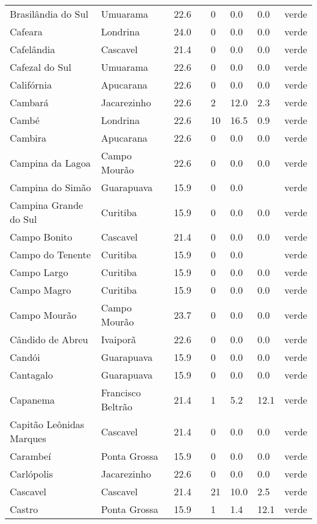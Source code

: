 \begin{longtable}{l|lllllll}
  Brasilândia do Sul & Umuarama & 22.6 &  & 0 & 0.0 & 0.0 & verde \\ 
  Cafeara & Londrina & 24.0 &  & 0 & 0.0 & 0.0 & verde \\ 
  Cafelândia & Cascavel & 21.4 &  & 0 & 0.0 & 0.0 & verde \\ 
  Cafezal do Sul & Umuarama & 22.6 &  & 0 & 0.0 & 0.0 & verde \\ 
  Califórnia & Apucarana & 22.6 &  & 0 & 0.0 & 0.0 & verde \\ 
  Cambará & Jacarezinho & 22.6 &  & 2 & 12.0 & 2.3 & verde \\ 
  Cambé & Londrina & 22.6 &  & 10 & 16.5 & 0.9 & verde \\ 
  Cambira & Apucarana & 22.6 &  & 0 & 0.0 & 0.0 & verde \\ 
  Campina da Lagoa & Campo Mourão & 22.6 &  & 0 & 0.0 & 0.0 & verde \\ 
  Campina do Simão & Guarapuava & 15.9 &  & 0 & 0.0 &  & verde \\ 
  Campina Grande do Sul & Curitiba & 15.9 &  & 0 & 0.0 & 0.0 & verde \\ 
  Campo Bonito & Cascavel & 21.4 &  & 0 & 0.0 & 0.0 & verde \\ 
  Campo do Tenente & Curitiba & 15.9 &  & 0 & 0.0 &  & verde \\ 
  Campo Largo & Curitiba & 15.9 &  & 0 & 0.0 & 0.0 & verde \\ 
  Campo Magro & Curitiba & 15.9 &  & 0 & 0.0 & 0.0 & verde \\ 
  Campo Mourão & Campo Mourão & 23.7 &  & 0 & 0.0 & 0.0 & verde \\ 
  Cândido de Abreu & Ivaiporã & 22.6 &  & 0 & 0.0 & 0.0 & verde \\ 
  Candói & Guarapuava & 15.9 &  & 0 & 0.0 & 0.0 & verde \\ 
  Cantagalo & Guarapuava & 15.9 &  & 0 & 0.0 & 0.0 & verde \\ 
  Capanema & Francisco Beltrão & 21.4 &  & 1 & 5.2 & 12.1 & verde \\ 
  Capitão Leônidas Marques & Cascavel & 21.4 &  & 0 & 0.0 & 0.0 & verde \\ 
  Carambeí & Ponta Grossa & 15.9 &  & 0 & 0.0 & 0.0 & verde \\ 
  Carlópolis & Jacarezinho & 22.6 &  & 0 & 0.0 & 0.0 & verde \\ 
  Cascavel & Cascavel & 21.4 &  & 21 & 10.0 & 2.5 & verde \\ 
  Castro & Ponta Grossa & 15.9 &  & 1 & 1.4 & 12.1 & verde \\ 

\end{longtable}
